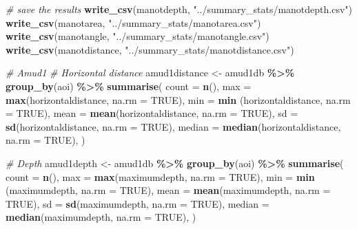 \documentclass[
]{article}
\newenvironment{Shaded}{\begin{snugshade}}{\end{snugshade}}
\newcommand{\AttributeTok}[1]{\textcolor[rgb]{0.13,0.29,0.53}{#1}}
\newcommand{\CommentTok}[1]{\textcolor[rgb]{0.56,0.35,0.01}{\textit{#1}}}
\newcommand{\ConstantTok}[1]{\textcolor[rgb]{0.56,0.35,0.01}{#1}}
\newcommand{\FunctionTok}[1]{\textcolor[rgb]{0.13,0.29,0.53}{\textbf{#1}}}
\newcommand{\NormalTok}[1]{#1}
\newcommand{\OtherTok}[1]{\textcolor[rgb]{0.56,0.35,0.01}{#1}}
\newcommand{\SpecialCharTok}[1]{\textcolor[rgb]{0.81,0.36,0.00}{\textbf{#1}}}
\newcommand{\StringTok}[1]{\textcolor[rgb]{0.31,0.60,0.02}{#1}}
\begin{document}
\begin{Shaded}
\begin{Highlighting}[]
\CommentTok{\# save the results }
\FunctionTok{write\_csv}\NormalTok{(manotdepth, }\StringTok{"../summary\_stats/manotdepth.csv"}\NormalTok{)}
\FunctionTok{write\_csv}\NormalTok{(manotarea, }\StringTok{"../summary\_stats/manotarea.csv"}\NormalTok{)}
\FunctionTok{write\_csv}\NormalTok{(manotangle, }\StringTok{"../summary\_stats/manotangle.csv"}\NormalTok{)}
\FunctionTok{write\_csv}\NormalTok{(manotdistance, }\StringTok{"../summary\_stats/manotdistance.csv"}\NormalTok{)}

\CommentTok{\# Amud1}
\CommentTok{\# Horizontal distance}
\NormalTok{amud1distance }\OtherTok{\textless{}{-}}\NormalTok{ amud1db }\SpecialCharTok{\%\textgreater{}\%} \FunctionTok{group\_by}\NormalTok{(aoi) }\SpecialCharTok{\%\textgreater{}\%}
      \FunctionTok{summarise}\NormalTok{(}
      \AttributeTok{count =} \FunctionTok{n}\NormalTok{(),}
      \AttributeTok{max =} \FunctionTok{max}\NormalTok{(horizontaldistance, }\AttributeTok{na.rm =} \ConstantTok{TRUE}\NormalTok{),}
      \AttributeTok{min =} \FunctionTok{min}\NormalTok{ (horizontaldistance, }\AttributeTok{na.rm =} \ConstantTok{TRUE}\NormalTok{),}
      \AttributeTok{mean =} \FunctionTok{mean}\NormalTok{(horizontaldistance, }\AttributeTok{na.rm =} \ConstantTok{TRUE}\NormalTok{),}
      \AttributeTok{sd =} \FunctionTok{sd}\NormalTok{(horizontaldistance, }\AttributeTok{na.rm =} \ConstantTok{TRUE}\NormalTok{),}
      \AttributeTok{median =} \FunctionTok{median}\NormalTok{(horizontaldistance, }\AttributeTok{na.rm =} \ConstantTok{TRUE}\NormalTok{),}
\NormalTok{  ) }

\CommentTok{\# Depth}
\NormalTok{amud1depth }\OtherTok{\textless{}{-}}\NormalTok{ amud1db }\SpecialCharTok{\%\textgreater{}\%} \FunctionTok{group\_by}\NormalTok{(aoi) }\SpecialCharTok{\%\textgreater{}\%}
      \FunctionTok{summarise}\NormalTok{(}
      \AttributeTok{count =} \FunctionTok{n}\NormalTok{(),}
      \AttributeTok{max =} \FunctionTok{max}\NormalTok{(maximumdepth, }\AttributeTok{na.rm =} \ConstantTok{TRUE}\NormalTok{),}
      \AttributeTok{min =} \FunctionTok{min}\NormalTok{ (maximumdepth, }\AttributeTok{na.rm =} \ConstantTok{TRUE}\NormalTok{),}
      \AttributeTok{mean =} \FunctionTok{mean}\NormalTok{(maximumdepth, }\AttributeTok{na.rm =} \ConstantTok{TRUE}\NormalTok{),}
      \AttributeTok{sd =} \FunctionTok{sd}\NormalTok{(maximumdepth, }\AttributeTok{na.rm =} \ConstantTok{TRUE}\NormalTok{),}
      \AttributeTok{median =} \FunctionTok{median}\NormalTok{(maximumdepth, }\AttributeTok{na.rm =} \ConstantTok{TRUE}\NormalTok{),}
\NormalTok{  ) }


\end{Highlighting}
\end{Shaded}
\end{document}
